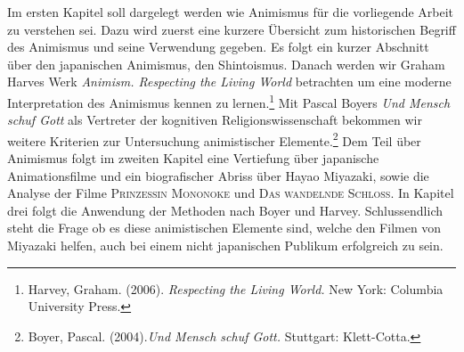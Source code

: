 Im ersten Kapitel soll dargelegt werden wie Animismus für die vorliegende Arbeit zu verstehen sei. Dazu wird zuerst eine kurzere Übersicht zum historischen Begriff des Animismus und seine Verwendung gegeben. Es folgt ein kurzer Abschnitt über den japanischen Animismus, den Shintoismus. Danach werden wir Graham Harves Werk \emph{Animism. Respecting the Living World} betrachten um eine moderne Interpretation des Animismus kennen zu lernen.\footnote{Harvey, Graham. (2006). \emph{Respecting the Living World.} New York: Columbia University Press.} Mit Pascal Boyers \emph{Und Mensch schuf Gott} als Vertreter der kognitiven Religionswissenschaft bekommen wir weitere Kriterien zur Untersuchung animistischer Elemente.\footnote{Boyer, Pascal. (2004).\emph{Und Mensch schuf Gott.} Stuttgart: Klett-Cotta.} Dem Teil über Animismus folgt im zweiten Kapitel eine Vertiefung über japanische Animationsfilme und ein biografischer Abriss über Hayao Miyazaki, sowie die Analyse der Filme \textsc{Prinzessin Mononoke} und \textsc{Das wandelnde Schloss}. In Kapitel drei folgt die Anwendung der Methoden nach Boyer und Harvey. Schlussendlich steht die Frage ob es diese animistischen Elemente sind, welche den Filmen von Miyazaki helfen, auch bei einem nicht japanischen Publikum erfolgreich zu sein.